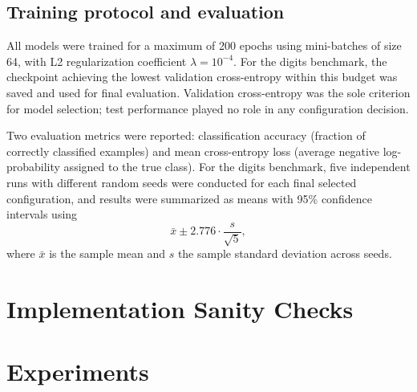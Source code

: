 \documentclass[11pt]{article}
\begin{document}
\subsection{Training protocol and evaluation}

All models were trained for a maximum of 200 epochs using mini-batches of size 64, with
L2 regularization coefficient $\lambda = 10^{-4}$. For the digits benchmark, the
checkpoint achieving the lowest validation cross-entropy within this budget was saved
and used for final evaluation. Validation cross-entropy was the sole criterion for
model selection; test performance played no role in any configuration decision.

Two evaluation metrics were reported: classification accuracy (fraction of correctly
classified examples) and mean cross-entropy loss (average negative log-probability
assigned to the true class). For the digits benchmark, five independent runs with
different random seeds were conducted for each final selected configuration, and results
were summarized as means with 95\% confidence intervals using
\begin{equation}
    \bar{x} \pm 2.776 \cdot \frac{s}{\sqrt{5}},
\end{equation}
where $\bar{x}$ is the sample mean and $s$ the sample standard deviation across seeds.

\section{Implementation Sanity Checks}


\section{Experiments}
\end{document}
